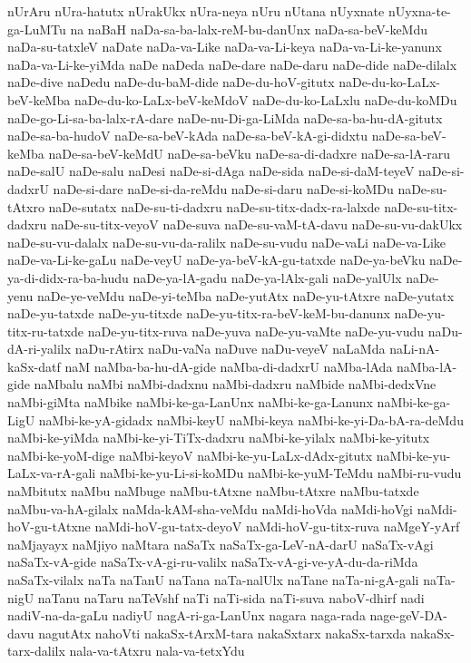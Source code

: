 {nUrAru
nUra-hatutx
nUrakUkx
nUra-neya
nUru
nUtana
nUyxnate
nUyxna-te-ga-LuMTu
na
naBaH
naDa-sa-ba-lalx-reM-bu-danUnx
naDa-sa-beV-keMdu
naDa-su-tatxleV
naDate
naDa-va-Like
naDa-va-Li-keya
naDa-va-Li-ke-yanunx
naDa-va-Li-ke-yiMda
naDe
naDeda
naDe-dare
naDe-daru
naDe-dide
naDe-dilalx
naDe-dive
naDedu
naDe-du-baM-dide
naDe-du-hoV-gitutx
naDe-du-ko-LaLx-beV-keMba
naDe-du-ko-LaLx-beV-keMdoV
naDe-du-ko-LaLxlu
naDe-du-koMDu
naDe-go-Li-sa-ba-lalx-rA-dare
naDe-nu-Di-ga-LiMda
naDe-sa-ba-hu-dA-gitutx
naDe-sa-ba-hudoV
naDe-sa-beV-kAda
naDe-sa-beV-kA-gi-didxtu
naDe-sa-beV-keMba
naDe-sa-beV-keMdU
naDe-sa-beVku
naDe-sa-di-dadxre
naDe-sa-lA-raru
naDe-salU
naDe-salu
naDesi
naDe-si-dAga
naDe-sida
naDe-si-daM-teyeV
naDe-si-dadxrU
naDe-si-dare
naDe-si-da-reMdu
naDe-si-daru
naDe-si-koMDu
naDe-su-tAtxro
naDe-sutatx
naDe-su-ti-dadxru
naDe-su-titx-dadx-ra-lalxde
naDe-su-titx-dadxru
naDe-su-titx-veyoV
naDe-suva
naDe-su-vaM-tA-davu
naDe-su-vu-dakUkx
naDe-su-vu-dalalx
naDe-su-vu-da-ralilx
naDe-su-vudu
naDe-vaLi
naDe-va-Like
naDe-va-Li-ke-gaLu
naDe-veyU
naDe-ya-beV-kA-gu-tatxde
naDe-ya-beVku
naDe-ya-di-didx-ra-ba-hudu
naDe-ya-lA-gadu
naDe-ya-lAlx-gali
naDe-yalUlx
naDe-yenu
naDe-ye-veMdu
naDe-yi-teMba
naDe-yutAtx
naDe-yu-tAtxre
naDe-yutatx
naDe-yu-tatxde
naDe-yu-titxde
naDe-yu-titx-ra-beV-keM-bu-danunx
naDe-yu-titx-ru-tatxde
naDe-yu-titx-ruva
naDe-yuva
naDe-yu-vaMte
naDe-yu-vudu
naDu-dA-ri-yalilx
naDu-rAtirx
naDu-vaNa
naDuve
naDu-veyeV
naLaMda
naLi-nA-kaSx-datf
naM
naMba-ba-hu-dA-gide
naMba-di-dadxrU
naMba-lAda
naMba-lA-gide
naMbalu
naMbi
naMbi-dadxnu
naMbi-dadxru
naMbide
naMbi-dedxVne
naMbi-giMta
naMbike
naMbi-ke-ga-LanUnx
naMbi-ke-ga-Lanunx
naMbi-ke-ga-LigU
naMbi-ke-yA-gidadx
naMbi-keyU
naMbi-keya
naMbi-ke-yi-Da-bA-ra-deMdu
naMbi-ke-yiMda
naMbi-ke-yi-TiTx-dadxru
naMbi-ke-yilalx
naMbi-ke-yitutx
naMbi-ke-yoM-dige
naMbi-keyoV
naMbi-ke-yu-LaLx-dAdx-gitutx
naMbi-ke-yu-LaLx-va-rA-gali
naMbi-ke-yu-Li-si-koMDu
naMbi-ke-yuM-TeMdu
naMbi-ru-vudu
naMbitutx
naMbu
naMbuge
naMbu-tAtxne
naMbu-tAtxre
naMbu-tatxde
naMbu-va-hA-gilalx
naMda-kAM-sha-veMdu
naMdi-hoVda
naMdi-hoVgi
naMdi-hoV-gu-tAtxne
naMdi-hoV-gu-tatx-deyoV
naMdi-hoV-gu-titx-ruva
naMgeY-yArf
naMjayayx
naMjiyo
naMtara
naSaTx
naSaTx-ga-LeV-nA-darU
naSaTx-vAgi
naSaTx-vA-gide
naSaTx-vA-gi-ru-valilx
naSaTx-vA-gi-ve-yA-du-da-riMda
naSaTx-vilalx
naTa
naTanU
naTana
naTa-nalUlx
naTane
naTa-ni-gA-gali
naTa-nigU
naTanu
naTaru
naTeVshf
naTi
naTi-sida
naTi-suva
naboV-dhirf
nadi
nadiV-na-da-gaLu
nadiyU
nagA-ri-ga-LanUnx
nagara
naga-rada
nage-geV-DA-davu
nagutAtx
nahoVti
nakaSx-tArxM-tara
nakaSxtarx
nakaSx-tarxda
nakaSx-tarx-dalilx
nala-va-tAtxru
nala-va-tetxYdu
}
